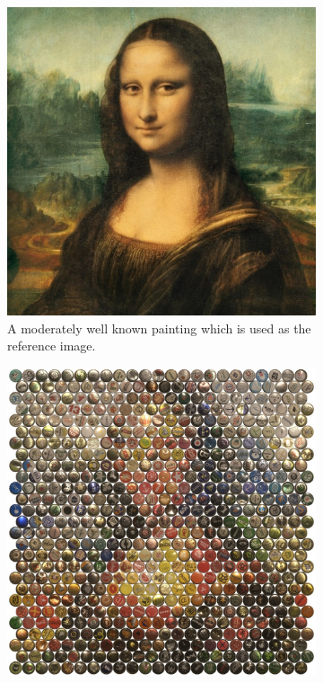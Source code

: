 \documentclass{article}
\begin{document}
\begin{figure}[h]
	\centering
	\begin{subfigure}[t]{0.3\linewidth}
		\centering
	        \includegraphics[width=\linewidth]{mona-lisa.jpg}
		\caption{A moderately well known painting which is used as the reference image.}
		\label{fig:mona1}
	\end{subfigure}
	\hfill
	\begin{subfigure}[t]{0.3\linewidth}
		\centering
		\includegraphics[width=\linewidth]{mona-lisa-caps-white.jpg}

\end{subfigure}
\end{figure}
\end{document}
